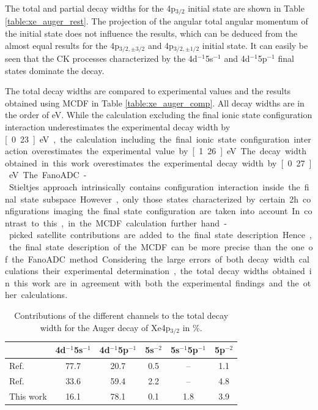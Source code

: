 The total and partial decay widths for the 4p$_{3/2}$ initial state
are shown in Table \ref{table:xe_auger_rest}. The projection of the
angular total angular momentum of the initial state does not influence
the results, which can be deduced from the almost equal results for the
4p$_{3/2,\pm 3/2}$ and 4p$_{3/2,\pm 1/2}$ initial state. It can easily be seen that
the \ac{CK} processes characterized by the 4d$^{-1}$5s$^{-1}$ and
4d$^{-1}$5p$^{-1}$ final states dominate the decay.

The total decay widths are compared
to experimental values and the results obtained using \ac{MCDF} in
Table \ref{table:xe_auger_comp}. All decay widths are in the order of \unit[1]{eV}.
While the calculation excluding the final ionic state configuration interaction
underestimates
the experimental decay width by \unit[0.23]{eV}, the calculation including the
final ionic state configuration interaction overestimates the experimental value
by \unit[1.26]{eV}. 
The decay width obtained in this work overestimates the experimental decay width
by \unit[0.27]{eV}. 
The FanoADC-Stieltjes approach intrinsically contains configuration interaction
inside the final state subspace. However, only those states characterized by
certain 2h configurations imaging the final state configuration are taken
into account. In contrast to this, in the \ac{MCDF} calculation further hand-picked
satellite contributions are added to the final state description.
Hence, the final state description of the \ac{MCDF} can be more precise
than the one of the FanoADC method.

Considering the large errors of both decay width calculations
their experimental determination, the total decay widths
obtained in this work are in agreement with both the experimental findings and
the other calculations.

\begin{table}[]
  \centering
  \caption{Contributions of the different channels to the total
           decay width for the Auger decay of Xe4p$_{3/2}$ in \%.}
  \begin{tabular}{lccccc}
   \toprule
                   & 4d$^{-1}$5s$^{-1}$ & 4d$^{-1}$5p$^{-1}$ & 5s$^{-2}$ & 5s$^{-1}$5p$^{-1}$ & 5p$^{-2}$ \\
   \midrule
   Ref. \cite{Heinaesmaeki04}\footnotemark[1] & 77.7 & 20.7  &       0.5 &       --           & 1.1     \\
   Ref. \cite{Heinaesmaeki04}\footnotemark[2] & 33.6 & 59.4  &       2.2 &       --           & 4.8     \\
   This work       &      16.1          &       78.1         &    0.1    &     1.8            & 3.9    \\
   \bottomrule
  \end{tabular}
  \label{table:Xe_auger_distr}
\end{table}

